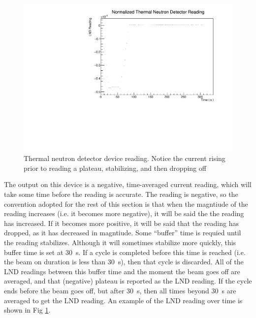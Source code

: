 \documentclass[10pt,letterpaper]{article}
\begin{document}
\begin{figure}
\centering
\includegraphics[width=\textwidth,page=1]{../thermal_neutron_detector/lndReadingVsTimeTCN18-042.pdf}
\caption{Thermal neutron detector device reading. Notice the current rising prior to reading a plateau, stabilizing, and then dropping off}
\label{fig:LNDplateau}
\end{figure}

The output on this device is a negative, time-averaged current reading, which will take some time before the reading is accurate. The reading is negative, so the convention adopted for the rest of this section is that when the magntiude of the reading increases (i.e. it becomes more negative), it will be said the the reading has increased. If it becomes more positive, it will be said that the reading has dropped, as it has decreased in magntiude. Some ``buffer'' time is requied until the reading stabilizes. Although it will sometimes stabilize more quickly, this buffer time is set at \SI{30}{\second}. If a cycle is completed before this time is reached (i.e. the beam on duration is less than \SI{30}{\second}), then that cycle is discarded. All of the LND readings between this buffer time and the moment the beam goes off are averaged, and that (negative) plateau is reported as the LND reading. If the cycle ends before the beam goes off, but after \SI{30}{\second}, then all times beyond \SI{30}{\second} are averaged to get the LND reading. An example of the LND reading over time is shown in Fig \ref{fig:LNDplateau}.
\end{document}
